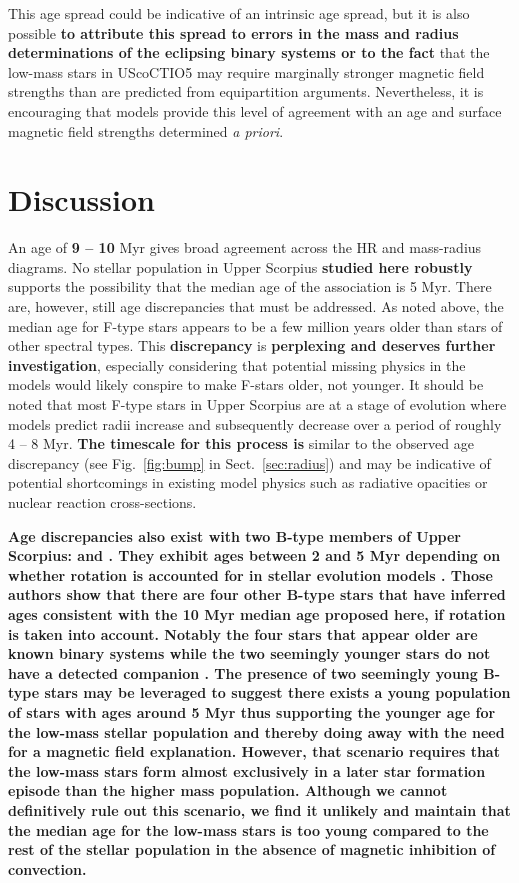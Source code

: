 \documentclass{aa}
\begin{document}
This age spread could be indicative of an intrinsic age spread, but it is also possible {\bf to attribute this spread to errors in the mass and radius determinations of the eclipsing binary systems or to the fact} that the low-mass stars in UScoCTIO5 may require marginally stronger magnetic field strengths than are predicted from equipartition arguments. Nevertheless, it is encouraging that models provide this level of agreement with an age and surface magnetic field strengths determined \emph{a priori}. 

\section{Discussion}
\label{sec:disc}
An age of {\bf 9 -- 10} Myr gives broad agreement across the HR and mass-radius diagrams. No stellar population in Upper Scorpius {\bf studied here robustly} supports the possibility that the median age of the association is 5 Myr. There are, however, still age discrepancies that must be addressed. As noted above, the median age for F-type stars appears to be a few million years older than stars of other spectral types. This {\bf discrepancy} is {\bf perplexing and deserves further investigation}, especially considering that potential missing physics in the models would likely conspire to make F-stars older, not younger. It should be noted that most F-type stars in Upper Scorpius are at a stage of evolution where models predict radii increase and subsequently decrease over a period of roughly 4 -- 8 Myr. {\bf The timescale for this process is} similar to the observed age discrepancy (see Fig.~\ref{fig:bump} in Sect.~\ref{sec:radius}) and may be indicative of potential shortcomings in existing model physics such as radiative opacities or nuclear reaction cross-sections. 

{\bf Age discrepancies also exist with two B-type members of Upper Scorpius:  and . They exhibit ages between 2 and 5 Myr depending on whether rotation is accounted for in stellar evolution models \citep{Pecaut2012}. Those authors show that there are four other B-type stars that have inferred ages consistent with the 10 Myr median age proposed here, if rotation is taken into account. Notably the four stars that appear older are known binary systems while the two seemingly younger stars do not have a detected companion \citep{Pecaut2012}. The presence of two seemingly young B-type stars may be leveraged to suggest there exists a young population of stars with ages around 5 Myr thus supporting the younger age for the low-mass stellar population and thereby doing away with the need for a magnetic field explanation. However, that scenario requires that the low-mass stars form almost exclusively in a later star formation episode than the higher mass population. Although we cannot definitively rule out this scenario, we find it unlikely and maintain that the {\bf median} age for the low-mass stars is too young compared to the rest of the stellar population in the absence of magnetic inhibition of convection.}
\end{document}
